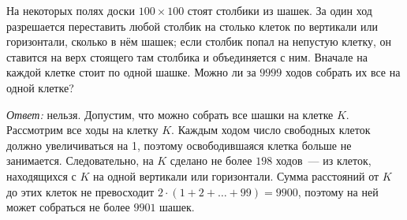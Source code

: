 \problem
На некоторых полях доски $100 \times 100$ стоят столбики из шашек.
За один ход разрешается переставить любой столбик на столько клеток по
вертикали или горизонтали, сколько в нём шашек;
если столбик попал на непустую клетку, он ставится на верх стоящего там
столбика и объединяется с ним.
Вначале на каждой клетке стоит по одной шашке.
Можно ли за $9999$ ходов собрать их все на одной клетке?

\solution
\emph{Ответ:} нельзя.
Допустим, что можно собрать все шашки на клетке $K$.
Рассмотрим все ходы на клетку $K$.
Каждым ходом число свободных клеток должно увеличиваться на 1, поэтому
освободившаяся клетка больше не занимается.
Следовательно, на $K$ сделано не более $198$ ходов~--- из клеток, находящихся
с $K$ на одной вертикали или горизонтали.
Сумма расстояний от $K$ до этих клеток не превосходит
$2 \cdot (1 + 2 + \ldots + 99) = 9900$,
поэтому на ней может собраться не более $9901$ шашек.

\endproblem
